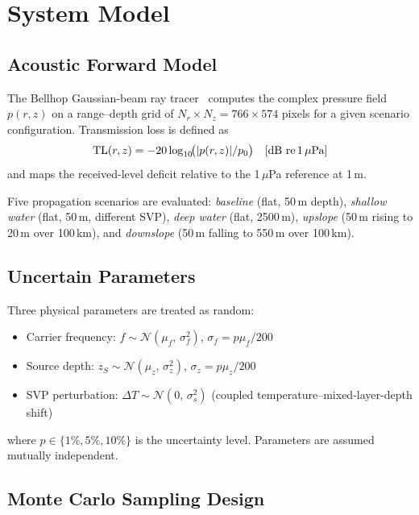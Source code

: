\documentclass[journal,10pt,twoside]{IEEEtran}
\newcommand{\TL}{\mathrm{TL}}
\begin{document}
\section{System Model}
\label{sec:model}

\subsection{Acoustic Forward Model}

The Bellhop Gaussian-beam ray tracer~\cite{porter1987} computes the complex
pressure field $p(r,z)$ on a range--depth grid of $N_r \times N_z =
766 \times 574$ pixels for a given scenario configuration.
Transmission loss is defined as
\begin{equation}
  \TL(r,z) = -20\log_{10}\!\bigl(|p(r,z)|/p_0\bigr) \quad [\text{dB re\,1}\,\mu\text{Pa}]
\end{equation}
and maps the received-level deficit relative to the 1\,$\mu$Pa reference at 1\,m.

Five propagation scenarios are evaluated:
\emph{baseline} (flat, 50\,m depth),
\emph{shallow water} (flat, 50\,m, different SVP),
\emph{deep water} (flat, 2500\,m),
\emph{upslope} (50\,m rising to 20\,m over 100\,km), and
\emph{downslope} (50\,m falling to 550\,m over 100\,km).

\subsection{Uncertain Parameters}

Three physical parameters are treated as random:
\begin{itemize}
  \item Carrier frequency: $f \sim \mathcal{N}(\mu_f,\, \sigma_f^2)$,
        $\sigma_f = p\mu_f/200$
  \item Source depth: $z_S \sim \mathcal{N}(\mu_z,\, \sigma_z^2)$,
        $\sigma_z = p\mu_z/200$
  \item SVP perturbation: $\Delta T \sim \mathcal{N}(0,\, \sigma_s^2)$
        (coupled temperature--mixed-layer-depth shift)
\end{itemize}
where $p \in \{1\%, 5\%, 10\%\}$ is the uncertainty level.
Parameters are assumed mutually independent.

\subsection{Monte Carlo Sampling Design}
\end{document}
